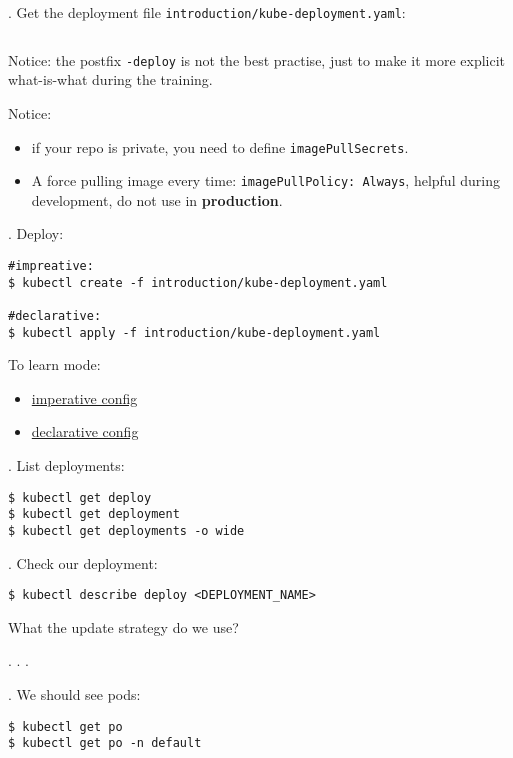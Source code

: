 \documentclass[12pt, letterpaper]{article}
\begin{document}
. Get the deployment file \texttt{introduction/kube-deployment.yaml}:

\inputminted{yaml}{introduction/kube-deployment.yaml}

\smallskip
Notice: the postfix \verb|-deploy| is not the best practise, just to make it more explicit what-is-what during the training.

\smallskip
Notice:
\begin{itemize}
\item if your repo is private, you need to define \verb|imagePullSecrets|.
\item A force pulling image every time: \verb|imagePullPolicy: Always|, helpful during development, do not use in \textbf{production}.
\end{itemize}

. Deploy:

\begin{verbatim}
#impreative:
$ kubectl create -f introduction/kube-deployment.yaml

#declarative:
$ kubectl apply -f introduction/kube-deployment.yaml
\end{verbatim}

To learn mode:\begin{itemize}
\item \href{https://kubernetes.io/docs/concepts/overview/object-management-kubectl/imperative-config/}{imperative config}
\item \href{https://kubernetes.io/docs/concepts/overview/object-management-kubectl/declarative-config/}{declarative config}
\end{itemize}

. List deployments:

\begin{verbatim}
$ kubectl get deploy
$ kubectl get deployment
$ kubectl get deployments -o wide
\end{verbatim}

. Check our deployment:

\begin{verbatim}
$ kubectl describe deploy <DEPLOYMENT_NAME>
\end{verbatim}

What the update strategy do we use?

   . . .

. We should see pods: 

\begin{verbatim}
$ kubectl get po
$ kubectl get po -n default
\end{verbatim}
\end{document}
